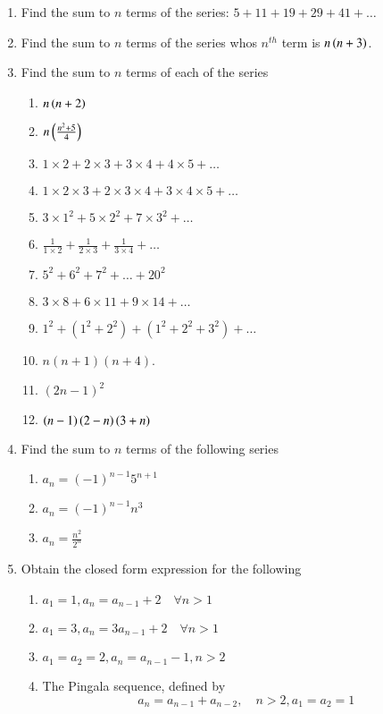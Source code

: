 \begin{enumerate}[label=\thesubsection.\arabic*,ref=\thesubsection.\theenumi]
%
	\item Find the sum to $n$ terms of the series: $5+11+19+29+41+\dots$
	\item Find the sum to $n$ terms of the series whos $n^{th}$ term is $n\left(n+3\right)$.
\item Find the sum to $n$ terms of each of the series
	\begin{multicols}{2}
		\begin{enumerate}[itemsep=1ex]
			\item $n\left(n+2\right)$
			\item $n\left(\frac{n^2+5}{4}\right)$
\item $1 \times 2 + 2 \times 3 + 3 \times 4 + 4 \times 5 +\dots $
\item $1 \times 2 \times 3 + 2 \times 3 \times 4 + 3 \times 4 \times 5 + \dots $
\item $3 \times 1^2 + 5 \times 2^2 + 7 \times 3^2 + \dots $
\item $\frac{1}{1 \times 2}+\frac{1}{2\times3}+\frac{1}{3\times4}+\dots $
\item $5^2 + 6^2 + 7^2 + \dots  + 20^2$
\item $3 \times 8 + 6 \times 11 + 9 \times 14 + \dots $
\item $1^2 + (1^2 + 2^2 ) + (1^2 + 2^2 + 3^2 ) + \dots $
\item $n (n+1) (n+4)$.
\item $(2 n - 1)^2$
\item $\left(n-1\right)\left(2-n\right)\left(3+n\right)$
\end{enumerate}
\end{multicols}
\item Find the sum to $n$ terms of the following series
\begin{enumerate}
\item $a_n = (-1)^{n-1}5^{n+1}$
\item $a_n = (-1)^{n-1}n^3$
\item $a_n = \frac{n^2}{2^n}$
\end{enumerate}
\item Obtain the closed form expression for the following
\begin{enumerate}
\item $a_1 = 1, a_n = a_{n-1}+2 \quad \forall n > 1$
\item $a_1 = 3, a_n = 3a_{n-1}+2 \quad \forall n > 1$
\item $a_1 = a_2 = 2, a_n = a_{n-1}-1, n > 2$ 
\item The Pingala sequence, defined by $$a_n = a_{n-1}+a_{n-2}, \quad n>2,  a_1 = a_2=1$$ 

\end{enumerate}
\end{enumerate}
